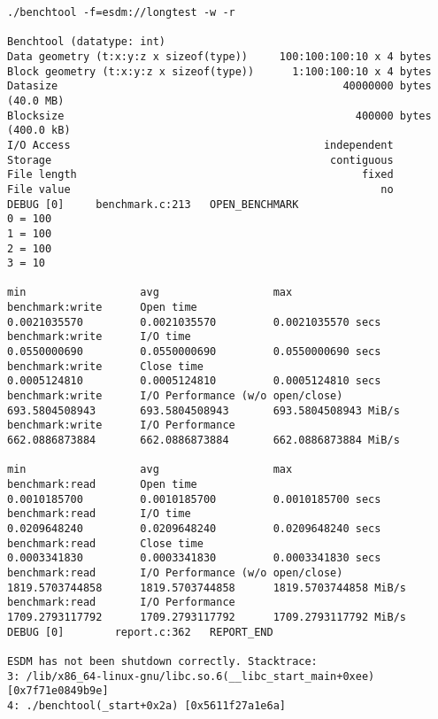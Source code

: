 \begin{verbatim}
./benchtool -f=esdm://longtest -w -r

Benchtool (datatype: int)
Data geometry (t:x:y:z x sizeof(type))     100:100:100:10 x 4 bytes
Block geometry (t:x:y:z x sizeof(type))      1:100:100:10 x 4 bytes
Datasize                                             40000000 bytes                (40.0 MB)
Blocksize                                              400000 bytes                (400.0 kB)
I/O Access                                        independent
Storage                                            contiguous
File length                                             fixed
File value                                                 no
DEBUG [0]     benchmark.c:213   OPEN_BENCHMARK
0 = 100
1 = 100
2 = 100
3 = 10
                                                                               min                  avg                  max
benchmark:write      Open time                                        0.0021035570         0.0021035570         0.0021035570 secs
benchmark:write      I/O time                                         0.0550000690         0.0550000690         0.0550000690 secs
benchmark:write      Close time                                       0.0005124810         0.0005124810         0.0005124810 secs
benchmark:write      I/O Performance (w/o open/close)               693.5804508943       693.5804508943       693.5804508943 MiB/s
benchmark:write      I/O Performance                                662.0886873884       662.0886873884       662.0886873884 MiB/s
                                                                               min                  avg                  max
benchmark:read       Open time                                        0.0010185700         0.0010185700         0.0010185700 secs
benchmark:read       I/O time                                         0.0209648240         0.0209648240         0.0209648240 secs
benchmark:read       Close time                                       0.0003341830         0.0003341830         0.0003341830 secs
benchmark:read       I/O Performance (w/o open/close)              1819.5703744858      1819.5703744858      1819.5703744858 MiB/s
benchmark:read       I/O Performance                               1709.2793117792      1709.2793117792      1709.2793117792 MiB/s
DEBUG [0]        report.c:362   REPORT_END

ESDM has not been shutdown correctly. Stacktrace:
3: /lib/x86_64-linux-gnu/libc.so.6(__libc_start_main+0xee) [0x7f71e0849b9e]
4: ./benchtool(_start+0x2a) [0x5611f27a1e6a]
\end{verbatim}

